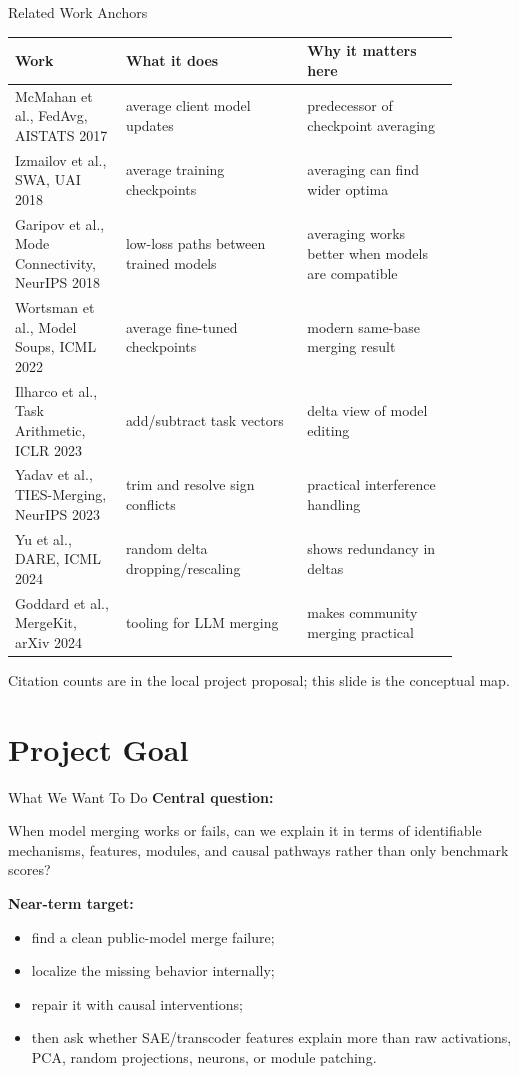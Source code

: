 \documentclass[aspectratio=169]{beamer}
\begin{document}
\begin{frame}{Related Work Anchors}
  \scriptsize
  \begin{tabular}{p{0.22\linewidth}p{0.36\linewidth}p{0.30\linewidth}}
    \toprule
    Work & What it does & Why it matters here \\
    \midrule
    McMahan et al., FedAvg, AISTATS 2017 & average client model updates & predecessor of checkpoint averaging \\
    Izmailov et al., SWA, UAI 2018 & average training checkpoints & averaging can find wider optima \\
    Garipov et al., Mode Connectivity, NeurIPS 2018 & low-loss paths between trained models & averaging works better when models are compatible \\
    Wortsman et al., Model Soups, ICML 2022 & average fine-tuned checkpoints & modern same-base merging result \\
    Ilharco et al., Task Arithmetic, ICLR 2023 & add/subtract task vectors & delta view of model editing \\
    Yadav et al., TIES-Merging, NeurIPS 2023 & trim and resolve sign conflicts & practical interference handling \\
    Yu et al., DARE, ICML 2024 & random delta dropping/rescaling & shows redundancy in deltas \\
    Goddard et al., MergeKit, arXiv 2024 & tooling for LLM merging & makes community merging practical \\
    \bottomrule
  \end{tabular}

  \vspace{0.15cm}
  \tiny Citation counts are in the local project proposal; this slide is the conceptual map.
\end{frame}

\section{Project Goal}

\begin{frame}{What We Want To Do}
  \textbf{Central question:}

  \vspace{0.15cm}
  When model merging works or fails, can we explain it in terms of identifiable mechanisms, features, modules, and causal pathways rather than only benchmark scores?

  \vspace{0.4cm}
  \textbf{Near-term target:}
  \begin{itemize}
    \item find a clean public-model merge failure;
    \item localize the missing behavior internally;
    \item repair it with causal interventions;
    \item then ask whether SAE/transcoder features explain more than raw activations, PCA, random projections, neurons, or module patching.
  \end{itemize}
\end{frame}
\end{document}

